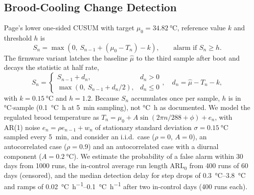 \documentclass[conference]{IEEEtran}
\begin{document}
\subsection{Brood-Cooling Change Detection}\label{sec:m-cusum}
Page's lower one-sided CUSUM with target $\mu_0 = \SI{34.82}{\celsius}$, reference value $k$ and threshold $h$ is~\cite{page1954,montgomery2013}
\begin{equation}
S_n = \max\!\left(0,\ S_{n-1} + (\mu_0 - T_n) - k\right), \qquad \text{alarm if } S_n \geq h.
\label{eq:page}
\end{equation}
The firmware variant latches the baseline $\hat\mu$ to the third sample after boot and decays the statistic at half rate,
\begin{equation}
S_n = \begin{cases} S_{n-1} + d_n, & d_n > 0\\ \max(0,\ S_{n-1} + d_n/2), & d_n \le 0\end{cases},\quad d_n = \hat\mu - T_n - k,
\label{eq:fw}
\end{equation}
with $k = \SI{0.15}{\celsius}$ and $h = 1.2$. Because $S_n$ accumulates once per sample, $h$ is in \si{\celsius}$\cdot$sample (\SI{0.1}{\celsius.h} at \SI{5}{min} sampling), not \si{\celsius.h} as documented. We model the regulated brood temperature as $T_n = \mu_0 + A\sin(2\pi n/288 + \phi) + e_n$, with AR(1) noise $e_n = \rho e_{n-1} + w_n$ of stationary standard deviation $\sigma = \SI{0.15}{\celsius}$ sampled every \SI{5}{min}, and consider an i.i.d.\ case ($\rho = 0$, $A = 0$), an autocorrelated case ($\rho = 0.9$) and an autocorrelated case with a diurnal component ($A = \SI{0.2}{\celsius}$). We estimate the probability of a false alarm within 30 days from 1000 runs, the in-control average run length $\mathrm{ARL}_0$ from 400 runs of 60 days (censored), and the median detection delay for step drops of \SIrange{0.3}{3.8}{\celsius} and ramps of \SIrange{0.02}{0.1}{\celsius\per\hour} after two in-control days (400 runs each).
\end{document}
